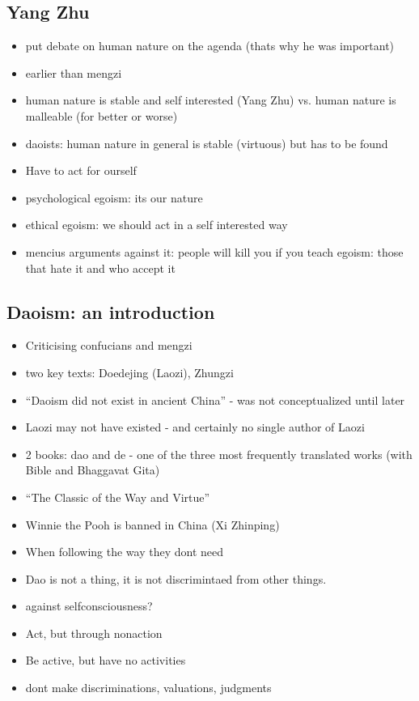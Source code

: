 \documentclass[emulatestandardclasses]{scrartcl}
\begin{document}
\subsection{Yang Zhu}

\begin{itemize}
  \item put debate on human nature on the agenda (thats why he was important)
  \item earlier than mengzi
  \item human nature is stable and self interested (Yang Zhu) vs. human nature is malleable (for better or worse)
  \item daoists: human nature in general is stable (virtuous) but has to be found
  \item Have to act for ourself
  \item psychological egoism: its our nature
  \item ethical egoism: we should act in a self interested way
  \item mencius arguments against it: people will kill you if you teach egoism: those that hate it and who accept it
\end{itemize}

\subsection{Daoism: an introduction}

\begin{itemize}
  \item Criticising confucians and mengzi
  \item two key texts: Doedejing (Laozi), Zhungzi
  \item "`Daoism did not exist in ancient China"' - was not conceptualized until later
  \item Laozi may not have existed - and certainly no single author of Laozi
  \item 2 books: dao and de - one of the three most frequently translated works (with Bible and Bhaggavat Gita)
  \item "`The Classic of the Way and Virtue"'
  \item Winnie the Pooh is banned in China (Xi Zhinping)
  \item When following the way they dont need 
  \item Dao is not a thing, it is not discrimintaed from other things.
  \item against selfconsciousness?
  \item Act, but through nonaction
  \item Be active, but have no activities
  \item dont make discriminations, valuations, judgments
\end{itemize}
\end{document}
